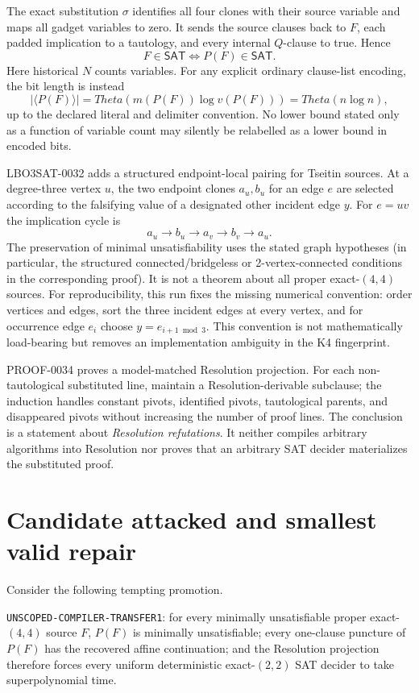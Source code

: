 \documentclass[11pt]{article}
\newcommand{\SAT}{\mathsf{SAT}}
\begin{document}
The exact substitution $\sigma$ identifies all four clones with their source
variable and maps all gadget variables to zero.  It sends the source clauses
back to $F$, each padded implication to a tautology, and every internal
$Q$-clause to true.  Hence
\[
       F\in\SAT \iff P(F)\in\SAT .
\]
Here historical $N$ counts variables.  For any explicit ordinary clause-list
encoding, the bit length is instead
\[
 |\langle P(F)\rangle|=Theta(m(P(F))\log v(P(F)))=Theta(n\log n),
\]
up to the declared literal and delimiter convention.  No lower bound stated
only as a function of variable count may silently be relabelled as a lower
bound in encoded bits.

LBO3SAT-0032 adds a structured endpoint-local pairing for Tseitin sources.
At a degree-three vertex $u$, the two endpoint clones $a_u,b_u$ for an edge
$e$ are selected according to the falsifying value of a designated other
incident edge $y$.  For $e=uv$ the implication cycle is
\[
        a_u\to b_u\to a_v\to b_v\to a_u.
\]
The preservation of minimal unsatisfiability uses the stated graph
hypotheses (in particular, the structured connected/bridgeless or
2-vertex-connected conditions in the corresponding proof).  It is not a
theorem about all proper exact-$(4,4)$ sources.  For reproducibility, this run
fixes the missing numerical convention: order vertices and edges, sort the
three incident edges at every vertex, and for occurrence edge $e_i$ choose
$y=e_{i+1\bmod 3}$.  This convention is not mathematically load-bearing but
removes an implementation ambiguity in the K4 fingerprint.

PROOF-0034 proves a model-matched Resolution projection.  For each
non-tautological substituted line, maintain a Resolution-derivable subclause;
the induction handles constant pivots, identified pivots, tautological
parents, and disappeared pivots without increasing the number of proof
lines.  The conclusion is a statement about \emph{Resolution refutations}.
It neither compiles arbitrary algorithms into Resolution nor proves that an
arbitrary SAT decider materializes the substituted proof.

\section{Candidate attacked and smallest valid repair}

Consider the following tempting promotion.

\medskip
\noindent\texttt{UNSCOPED-COMPILER-TRANSFER1}: for every minimally
unsatisfiable proper exact-$(4,4)$ source $F$, $P(F)$ is minimally
unsatisfiable; every one-clause puncture of $P(F)$ has the recovered affine
continuation; and the Resolution projection therefore forces every uniform
deterministic exact-$(2,2)$ SAT decider to take superpolynomial time.
\end{document}
